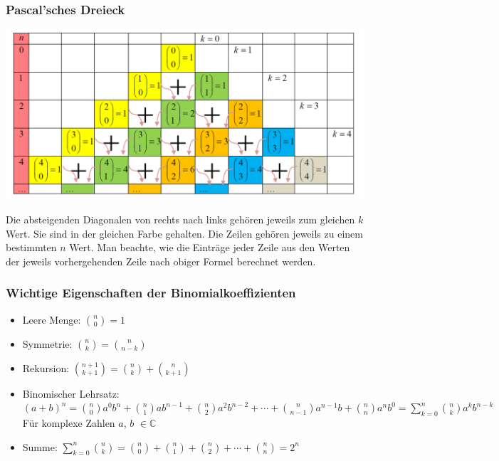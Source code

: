 \subsubsection{Pascal'sches Dreieck}
\begin{center}
    \includegraphics[width=1\linewidth]{images/pascal.png}
\end{center}
Die absteigenden Diagonalen von rechts nach links gehören jeweils zum gleichen $k$ Wert. 
Sie sind in der gleichen Farbe gehalten. Die Zeilen gehören jeweils zu einem bestimmten $n$ Wert. 
Man beachte, wie die Einträge jeder Zeile aus den Werten der jeweils vorhergehenden Zeile nach obiger Formel berechnet werden.
\subsubsection{Wichtige Eigenschaften der Binomialkoeffizienten}
\label{sec:wichtige-eigenschaften-der-binomialkoeffizienten}
\begin{itemize}
    \item Leere Menge: $\binom{n}{0} = 1$
    \item Symmetrie: $\binom{n}{k} = \binom{n}{n-k}$
    \item Rekursion: $\binom{n+1}{k+1} = \binom{n}{k} + \binom{n}{k+1}$
    \item Binomischer Lehrsatz: $(a+b)^n = \binom{n}{0}a^0b^n + \binom{n}{1}ab^{n-1} + \binom{n}{2}a^2b^{n-2} + \cdots + \binom{n}{n-1}a^{n-1}b + \binom{n}{n}a^nb^0 = 
        \sum_{k=0}^n \binom{n}{k}a^kb^{n-k}$ Für komplexe Zahlen $a$, $b$ $\in \mathbb{C}$
    \item Summe: $\sum^n_{k=0} \binom{n}{k} = \binom{n}{0} + \binom{n}{1} + \binom{n}{2} + \cdots + \binom{n}{n} = 2^n$
\end{itemize}